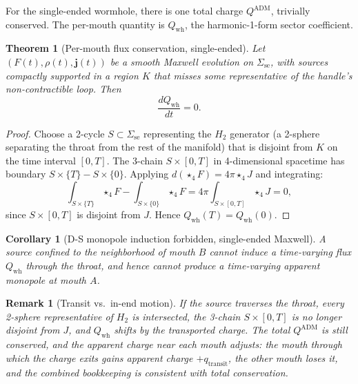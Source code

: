 \documentclass[aps,prd,onecolumn,nofootinbib,superscriptaddress]{revtex4-2}
\newtheorem{theorem}{Theorem}
\newtheorem{corollary}{Corollary}
\newtheorem{remark}{Remark}
\begin{document}
For the single-ended wormhole, there is one total charge $Q^{\mathrm{ADM}}$,
trivially conserved.  The per-mouth quantity is $Q_{\mathrm{wh}}$, the
harmonic-1-form sector coefficient.

\begin{theorem}[Per-mouth flux conservation, single-ended]
\label{thm:Q-conservation-1e}
Let $(F(t),\rho(t),\bm{j}(t))$ be a smooth Maxwell evolution on
$\Sigma_{\mathrm{se}}$, with sources compactly supported in a region $K$ that
misses some representative of the handle's non-contractible loop.  Then
\begin{equation}
  \frac{dQ_{\mathrm{wh}}}{dt} = 0.
\end{equation}
\end{theorem}

\begin{proof}
Choose a 2-cycle $S\subset\Sigma_{\mathrm{se}}$ representing the $H_2$
generator (a 2-sphere separating the throat from the rest of the manifold)
that is disjoint from $K$ on the time interval $[0,T]$.  The 3-chain
$S\times[0,T]$ in 4-dimensional spacetime has boundary
$S\times\{T\}-S\times\{0\}$.  Applying $d(\star_4 F)=4\pi\star_4 J$ and
integrating:
\begin{equation}
  \int_{S\times\{T\}}\star_4 F - \int_{S\times\{0\}}\star_4 F
  = 4\pi\int_{S\times[0,T]}\star_4 J = 0,
\end{equation}
since $S\times[0,T]$ is disjoint from $J$.  Hence $Q_{\mathrm{wh}}(T)=Q_{\mathrm{wh}}(0)$.
\end{proof}

\begin{corollary}[D-S monopole induction forbidden, single-ended Maxwell]
A source confined to the neighborhood of mouth $B$ cannot induce a
time-varying flux $Q_{\mathrm{wh}}$ through the throat, and hence cannot
produce a time-varying apparent monopole at mouth $A$.
\end{corollary}

\begin{remark}[Transit vs.\ in-end motion]
If the source \emph{traverses} the throat, every 2-sphere representative of
$H_2$ is intersected, the 3-chain $S\times[0,T]$ is no longer disjoint from
$J$, and $Q_{\mathrm{wh}}$ shifts by the transported charge.  The total
$Q^{\mathrm{ADM}}$ is still conserved, and the apparent charge near each mouth
adjusts: the mouth through which the charge exits gains apparent charge
$+q_{\mathrm{transit}}$, the other mouth loses it, and the combined bookkeeping
is consistent with total conservation.
\end{remark}
\end{document}
